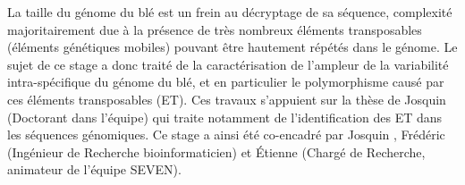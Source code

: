\documentclass[a4paper, 12pt]{article}
\begin{document}
\begin{onehalfspace}
La taille du génome du blé est un frein au décryptage de sa séquence, complexité majoritairement due à la présence de très nombreux éléments transposables (éléments génétiques mobiles) pouvant être hautement répétés dans le génome. Le sujet de ce stage a donc traité de la caractérisation de l'ampleur de la variabilité intra-spécifique du génome du blé, et en particulier le polymorphisme causé par ces éléments transposables (ET). Ces travaux s'appuient sur la thèse de Josquin  (Doctorant dans l'équipe) qui traite notamment de l'identification des ET dans les séquences génomiques. Ce stage a ainsi été co-encadré par Josquin , Frédéric  (Ingénieur de Recherche bioinformaticien) et Étienne  (Chargé de Recherche, animateur de l'équipe SEVEN).\\


\end{onehalfspace}
\end{document}
